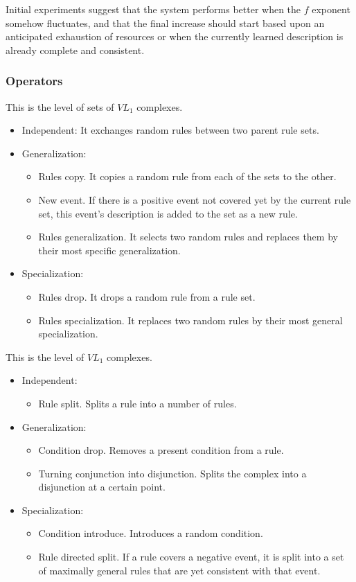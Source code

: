 \documentclass[12pt]{article}
\newcounter{subsubsubsection}[subsubsection]
\begin{document}
Initial experiments suggest that the system performs better when the $f$ exponent somehow fluctuates, and that the final increase should start based upon an anticipated exhaustion of resources or when the currently learned description is already complete and consistent.

\subsubsection{Operators}
This is the level of sets of $VL_1$ complexes.
\begin{itemize}
\item Independent: It exchanges random rules between two parent rule sets.
\item Generalization:
\begin{itemize}
\item Rules copy. It copies a random rule from each of the sets to the other.
\item New event. If there is a positive event not covered yet by the current rule set, this event's description is added to the set as a new rule.
\item Rules generalization. It selects two random rules and replaces them by their most specific generalization.
\end{itemize}
\item Specialization:
\begin{itemize}
\item Rules drop. It drops a random rule from a rule set.
\item Rules specialization. It replaces two random rules by their most general specialization.
\end{itemize}
\end{itemize}

This is the level of $VL_1$ complexes.
\begin{itemize}
\item Independent:
\begin{itemize}
\item Rule split. Splits a rule into a number of rules.
\end{itemize}
\item Generalization:
\begin{itemize}
\item Condition drop. Removes a present condition from a rule.
\item Turning conjunction into disjunction. Splits the complex into a disjunction at a certain point.
\end{itemize}
\item Specialization:
\begin{itemize}
\item Condition introduce. Introduces a random condition.
\item Rule directed split. If a rule covers a negative event, it is split into a set of maximally general rules that are yet consistent with that event.
\end{itemize}
\end{itemize}
\end{document}
